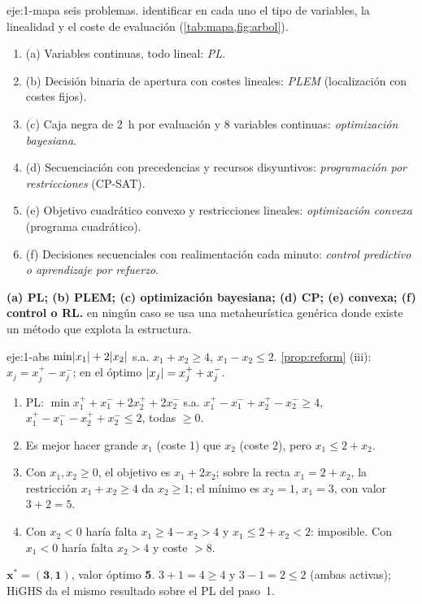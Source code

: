 \begin{solucion}{eje:1-mapa}
\datos seis problemas.
\planteamiento identificar en cada uno el tipo de variables, la linealidad y el coste de evaluación (\cref{tab:mapa,fig:arbol}).
\pasos
\begin{enumerate}[label=\arabic*.]
  \item (a) Variables continuas, todo lineal: \emph{PL}.
  \item (b) Decisión binaria de apertura con costes lineales: \emph{PLEM} (localización con costes fijos).
  \item (c) Caja negra de 2~h por evaluación y 8 variables continuas: \emph{optimización bayesiana}.
  \item (d) Secuenciación con precedencias y recursos disyuntivos: \emph{programación por restricciones} (CP-SAT).
  \item (e) Objetivo cuadrático convexo y restricciones lineales: \emph{optimización convexa} (programa cuadrático).
  \item (f) Decisiones secuenciales con realimentación cada minuto: \emph{control predictivo o aprendizaje por refuerzo}.
\end{enumerate}
\resultado \textbf{(a) PL; (b) PLEM; (c) optimización bayesiana; (d) CP; (e) convexa; (f) control o RL.}
\comprobacion en ningún caso se usa una metaheurística genérica donde existe un método que explota la estructura.
\end{solucion}

\begin{solucion}{eje:1-abs}
\datos $\min\lvert x_1\rvert+2\lvert x_2\rvert$ s.a. $x_1+x_2\ge 4$, $x_1-x_2\le 2$.
\planteamiento \cref{prop:reform} (iii): $x_j=x_j^{+}-x_j^{-}$; en el óptimo $\lvert x_j\rvert=x_j^{+}+x_j^{-}$.
\pasos
\begin{enumerate}[label=\arabic*.]
  \item PL: $\min x_1^{+}+x_1^{-}+2x_2^{+}+2x_2^{-}$ s.a. $x_1^{+}-x_1^{-}+x_2^{+}-x_2^{-}\ge 4$, $x_1^{+}-x_1^{-}-x_2^{+}+x_2^{-}\le 2$, todas $\ge 0$.
  \item Es mejor hacer grande $x_1$ (coste 1) que $x_2$ (coste 2), pero $x_1\le 2+x_2$.
  \item Con $x_1,x_2\ge 0$, el objetivo es $x_1+2x_2$; sobre la recta $x_1=2+x_2$, la restricción $x_1+x_2\ge 4$ da $x_2\ge 1$; el mínimo es $x_2=1$, $x_1=3$, con valor $3+2=5$.
  \item Con $x_2<0$ haría falta $x_1\ge 4-x_2>4$ y $x_1\le 2+x_2<2$: imposible. Con $x_1<0$ haría falta $x_2>4$ y coste $>8$.
\end{enumerate}
\resultado $\bm{x^{*}=(3,1)}$, valor óptimo \textbf{5}.
\comprobacion $3+1=4\ge 4$ y $3-1=2\le 2$ (ambas activas); HiGHS da el mismo resultado sobre el PL del paso~1.
\end{solucion}

